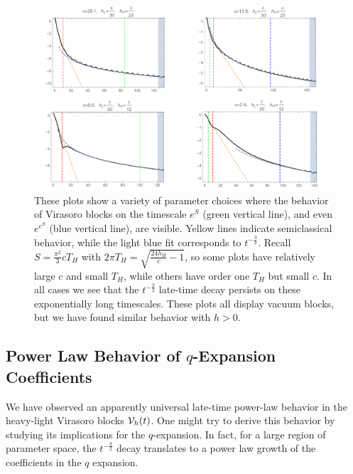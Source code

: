 \begin{figure}[h]
\begin{centering}
\includegraphics[width=0.98\textwidth]{virasoro_chapter/VBlockESEES}
\caption[Behavior of Virasoro blocks on exponentially large Lorentzian time scales]{ These plots show a variety of parameter choices where the behavior of Virasoro blocks on the timescale $e^S$ (green vertical line), and even $e^{e^S}$ (blue vertical line), are visible.  Yellow lines indicate semiclassical behavior, while the light blue fit corresponds to $t^{-\frac{3}{2}}$.  Recall $S = \frac{\pi^2}{3} c T_H$ with $2 \pi T_H =  \sqrt{\frac{24 h_H}{c} - 1}$, so some plots have relatively large $c$ and small $T_H$, while others have order one $T_H$ but small $c$. In all cases we see that the $t^{-\frac{3}{2}}$ late-time decay persists on these exponentially long timescales.  These plots all display vacuum blocks, but we have found similar behavior with $h > 0$.}
\label{fig:VBlockESEES}
\end{centering}
\end{figure}

\subsection{Power Law Behavior of $q$-Expansion Coefficients}
\label{sec:CoeffPowerLaw}

We have observed an apparently universal late-time power-law behavior in the heavy-light Virasoro blocks ${\cal V}_h(t)$.  One might try to derive this behavior by studying its implications for the $q$-expansion.  In fact, for a large region of parameter space, the $t^{-\frac{3}{2}}$ decay  translates to a power law growth of the coefficients in the $q$ expansion. 

